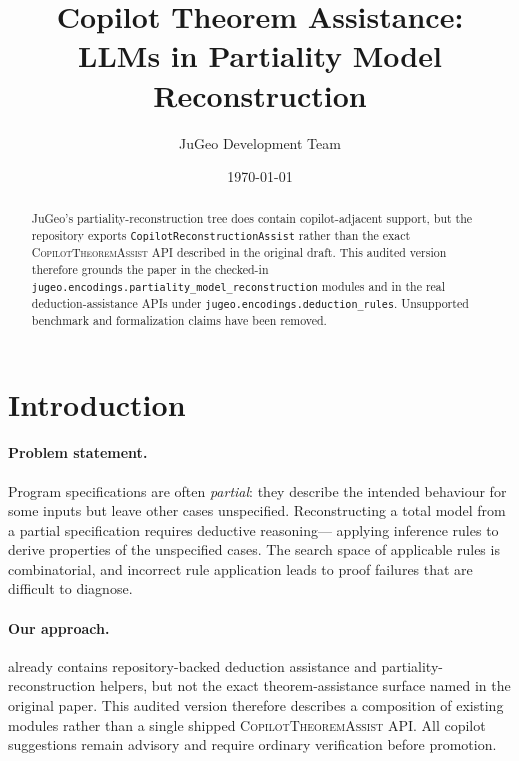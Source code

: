 \documentclass[11pt]{article}
\title{Copilot Theorem Assistance:\\
LLMs in Partiality Model Reconstruction}
\author{JuGeo Development Team}
\date{\today}
\newcommand{\ThAssist}{\textsc{CopilotTheoremAssist}}
\begin{document}
\maketitle

\begin{abstract}
JuGeo's partiality-reconstruction tree does contain copilot-adjacent
support, but the repository exports
\texttt{CopilotReconstructionAssist} rather than the exact
\ThAssist{} API described in the original draft.  This audited version
therefore grounds the paper in the checked-in
\texttt{jugeo.encodings.partiality\_model\_reconstruction} modules and in
the real deduction-assistance APIs under
\texttt{jugeo.encodings.deduction\_rules}.  Unsupported benchmark and
formalization claims have been removed.
\end{abstract}

\section{Introduction}\label{sec:intro}

\paragraph{Problem statement.}
Program specifications are often \emph{partial}: they describe the intended
behaviour for some inputs but leave other cases unspecified.  Reconstructing
a total model from a partial specification requires deductive reasoning---
applying inference rules to derive properties of the unspecified cases.
The search space of applicable rules is combinatorial, and incorrect rule
application leads to proof failures that are difficult to diagnose.

\paragraph{Our approach.}
\JuGeo{} already contains repository-backed deduction assistance and
partiality-reconstruction helpers, but not the exact theorem-assistance
surface named in the original paper.  This audited version therefore
describes a composition of existing modules rather than a single shipped
\ThAssist{} API.  All copilot suggestions remain advisory and require
ordinary verification before promotion.
\end{document}
